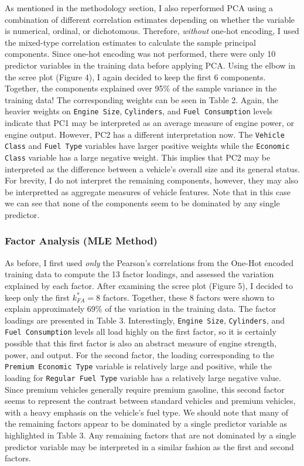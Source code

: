 \documentclass[11pt]{article}
\begin{document}
As mentioned in the methodology section, I also reperformed PCA  using a combination of different correlation estimates depending on whether the variable is numerical, ordinal, or dichotomous. Therefore, \textit{without} one-hot encoding, I used the mixed-type correlation estimates to calculate the sample principal components. Since one-hot encoding was not performed, there were only 10 predictor variables in the training data before applying PCA. Using the elbow in the scree plot (Figure 4), I again decided to keep the first 6 components. Together, the components explained over 95\% of the sample variance in the training data! The corresponding weights can be seen in Table 2. Again, the heavier weights on \texttt{Engine Size}, \texttt{Cylinders}, and \texttt{Fuel Consumption} levels indicate that PC1 may be interpreted as an average measure of engine power, or engine output. However, PC2 has a different interpretation now. The \texttt{Vehicle Class} and \texttt{Fuel Type} variables have larger positive weights while the \texttt{Economic Class} variable has a large negative weight. This implies that PC2 may be interpreted as the difference between a vehicle's overall size and its general status. For brevity, I do not interpret the remaining components, however, they may also be interpretted as aggregate measures of vehicle features. Note that in this case we can see that none of the components seem to be dominated by any single predictor.

\subsubsection*{Factor Analysis (MLE Method)}

As before, I first used \textit{only} the Pearson's correlations from the One-Hot encoded training data to compute the 13 factor loadings, and assessed the variation explained by each factor. After examining the scree plot (Figure 5), I decided to keep only the first $k_{FA}^* = 8$ factors. Together, these 8 factors were shown to explain approximately 69\% of the variation in the training data. The factor loadings are presented in Table 3. Interestingly, \texttt{Engine Size}, \texttt{Cylinders}, and \texttt{Fuel Consumption} levels all load highly on the first factor, so it is certainly possible that this first factor is also an abstract measure of engine strength, power, and output. For the second factor, the loading corresponding to the \texttt{Premium Economic Type} variable is relatively large and positive, while the loading for \texttt{Regular Fuel Type} variable has a relatively large negative value. Since premium vehicles generally require premium gasoline, this second factor seems to represent the contrast between standard vehicles and premium vehicles, with a heavy emphasis on the vehicle's fuel type. We should note that many of the remaining factors appear to be dominated by a single predictor variable as highlighted in Table 3. Any remaining factors that are not dominated by a single predictor variable may be interpreted in a similar fashion as the first and second factors.
\end{document}
